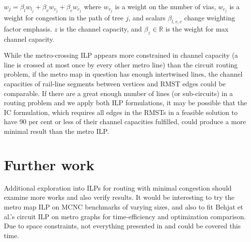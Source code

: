 \documentclass[twocolumn]{article}
\begin{document}
$w_j = \beta_{l}w_{l_{j}} + \beta_{v}w_{v_{j}} + \beta_{c}w_{c_{j}}$ where
$w_{v_{j}}$ is a weight on the number of vias, $w_{c_{j}}$ is a weight for congestion in the path
of tree $j$, and scalars $\beta_{l, v, c}$ change weighting factor emphasis. $z$ is the channel
capacity, and $\beta_z \in \mathbb{R}$ is the weight for max channel capacity.

While the metro-crossing ILP appears more constrained in channel capacity
(a line is crossed at most once by every other metro line) than the circuit
routing problem, if the metro map in question has enough intertwined lines,
the channel capacities of rail-line segments between vertices and RMST edges could
be comparable. If there are a great enough number of lines (or sub-circuits) in a
routing problem and we apply both ILP formulations, it may be possible that the IC
formulation, which requires all edges in the RMSTs in a feasible solution to have
90 per cent or less of their channel capacities fulfilled, could produce a more
minimal result than the metro ILP.

\section*{Further work}

Additional exploration into ILPs for routing with minimal congestion
should examine more works and also verify results.
It would be interesting to try the metro map ILP on MCNC
benchmarks of varying sizes, and also to fit Behjat et al.'s circuit ILP on metro
graphs for time-efficiency and optimization comparison. Due to space constraints,
not everything presented in \cite{behjat} and \cite{asquith} could be covered this time.


\end{document}
